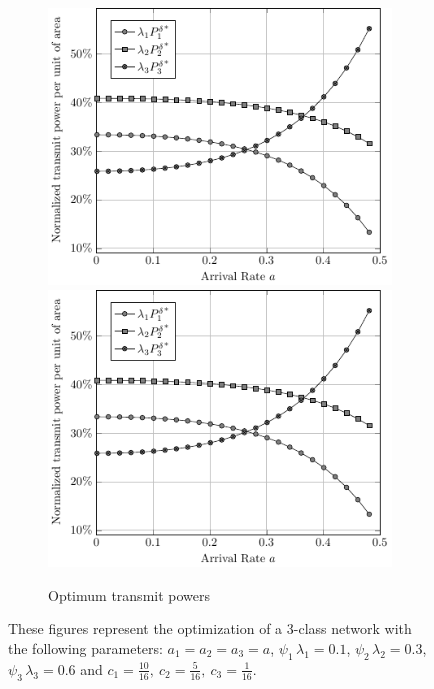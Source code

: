 \begin{figure}
\begin{subfigure}{.05\textwidth}
\end{subfigure}%
\begin{subfigure}[t]{.45\textwidth}
  \centering
    \if{}
        \includegraphics[width=\textwidth]{Figures/Ch7_Opt_Power_equal_a.pdf}
    \else
        \includegraphics[draft,width=\textwidth]{Figures/Ch7_Opt_Power_equal_a.pdf}
    \fi
    \caption{Optimum transmit powers}
\label{fig:Opt_Power_equal}
\end{subfigure}
\caption{These figures represent the optimization of a 3-class network with the following parameters: $a_1=a_2=a_3=a$, $\psi_1\,\lambda_1 = 0.1$, $\psi_2\,\lambda_2 = 0.3$, $\psi_3\,\lambda_3 = 0.6$ and $c_1 = \frac{10}{16},~ c_2 = \frac{5}{16},~ c_3 = \frac{1}{16}$.}
\label{fig:opt}
\end{figure}

